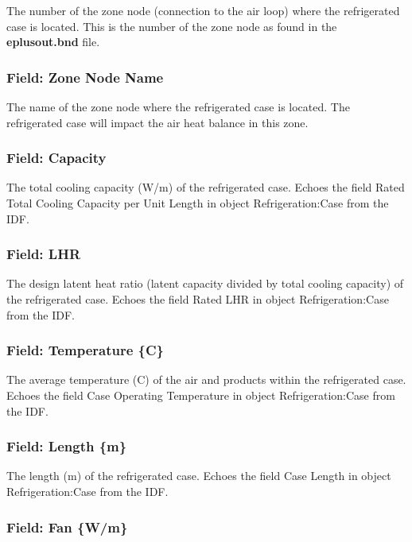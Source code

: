 The number of the zone node (connection to the air loop) where the refrigerated case is located. This is the number of the zone node as found in the \textbf{eplusout.bnd} file.

\subsubsection{Field: Zone Node Name}\label{field-zone-node-name}

The name of the zone node where the refrigerated case is located. The refrigerated case will impact the air heat balance in this zone.

\subsubsection{Field: Capacity}\label{field-capacity}

The total cooling capacity (W/m) of the refrigerated case. Echoes the field Rated Total Cooling Capacity per Unit Length in object Refrigeration:Case from the IDF.

\subsubsection{Field: LHR}\label{field-lhr}

The design latent heat ratio (latent capacity divided by total cooling capacity) of the refrigerated case. Echoes the field Rated LHR in object Refrigeration:Case from the IDF.

\subsubsection{Field: Temperature \{C\}}\label{field-temperature-c}

The average temperature (C) of the air and products within the refrigerated case. Echoes the field Case Operating Temperature in object Refrigeration:Case from the IDF.

\subsubsection{Field: Length \{m\}}\label{field-length-m}

The length (m) of the refrigerated case. Echoes the field Case Length in object Refrigeration:Case from the IDF.

\subsubsection{Field: Fan \{W/m\}}\label{field-fan-wm}

